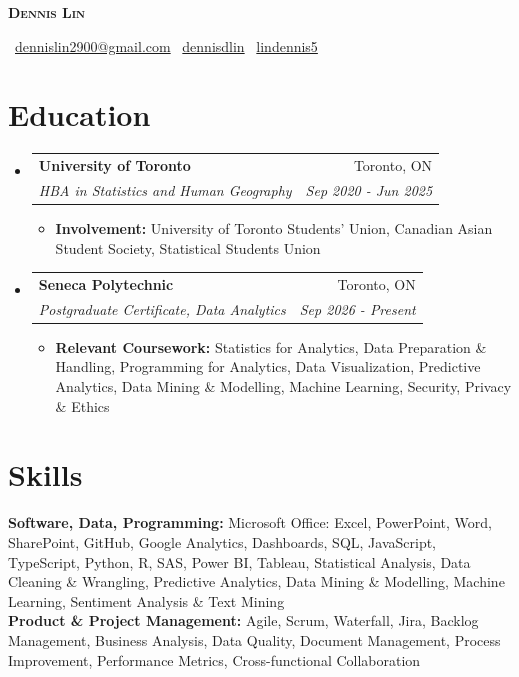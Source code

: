 \documentclass[letterpaper,11pt]{article}
\makeatletter
\newcommand{\resumeItem}[1]{
  \item\small{
    {#1 \vspace{-2pt}}
  }
}
\newcommand{\resumeSubheading}[4]{
  \vspace{-2pt}\item
  \begin{tabular*}{0.97\textwidth}[t]{l@{\extracolsep{\fill}}r}
    \textbf{#1} & #2 \\
    \textit{\small #3} & \textit{\small #4} \\
  \end{tabular*}\vspace{-7pt}
}
\newcommand{\resumeSubHeadingListStart}{
  \begin{itemize}[leftmargin=0.15in,label={}]
}
\newcommand{\resumeSubHeadingListEnd}{
  \end{itemize}
}
\newcommand{\resumeItemListStart}{
  \begin{itemize}
}
\newcommand{\resumeItemListEnd}{
  \end{itemize}\vspace{-5pt}
}
\makeatother
\begin{document}
\begin{center}
  \textbf{\Huge \scshape Dennis Lin} \\[2pt]
  {\small

    \faEnvelope\ \href{mailto:dennislin2900@gmail.com}{dennislin2900@gmail.com} \quad
    \faLinkedin\ \href{https://www.linkedin.com/in/dennisdlin}{dennisdlin} \quad
    \faGithub\ \href{https://github.com/lindennis5}{lindennis5}
  }
\end{center}

\section{Education}

\resumeSubHeadingListStart

  \resumeSubheading
    {University of Toronto}{Toronto, ON}
    {HBA in Statistics and Human Geography}{Sep 2020 - Jun 2025}
    \resumeItemListStart
      \resumeItem{\textbf{Involvement:} University of Toronto Students' Union, Canadian Asian Student Society, Statistical Students Union}
    \resumeItemListEnd

  \resumeSubheading
    {Seneca Polytechnic}{Toronto, ON}
    {Postgraduate Certificate, Data Analytics}{Sep 2026 - Present}
    \resumeItemListStart
      \resumeItem{\textbf{Relevant Coursework:} Statistics for Analytics, Data Preparation \& Handling, Programming for Analytics, Data Visualization, Predictive Analytics, Data Mining \& Modelling, Machine Learning, Security, Privacy \& Ethics}
    \resumeItemListEnd

\resumeSubHeadingListEnd
\vspace{-12pt}

\section{Skills}

\begin{flushleft}
\small
\textbf{Software, Data, Programming:} Microsoft Office: Excel, PowerPoint, Word, SharePoint, GitHub, Google Analytics, Dashboards, SQL, JavaScript, TypeScript, Python, R, SAS, Power BI, Tableau, Statistical Analysis, Data Cleaning \& Wrangling, Predictive Analytics, Data Mining \& Modelling, Machine Learning, Sentiment Analysis \& Text Mining \\
\textbf{Product \& Project Management:} Agile, Scrum, Waterfall, Jira, Backlog Management, Business Analysis, Data Quality, Document Management, Process Improvement, Performance Metrics, Cross-functional Collaboration
\end{flushleft}
\end{document}
